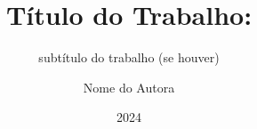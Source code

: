 \documentclass[a4paper,12pt,oneside]{memoir}
\title{Título do Trabalho:}
\subtitle{subtítulo do trabalho (se houver)}
\author{Nome do Autora}
\date{2024}
\begin{document}
\frontmatter
\pretextual


\mainmatter
\textual



\end{document}
